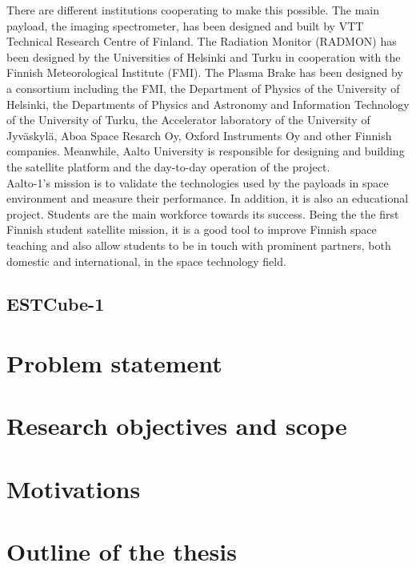 There are different institutions cooperating to make this possible. The main payload, the imaging spectrometer, has been designed and built by VTT Technical Research Centre of Finland. The Radiation Monitor (RADMON) has been designed by the Universities of Helsinki and Turku in cooperation with the Finnish Meteorological Institute (FMI). The Plasma Brake has been designed by a consortium including the FMI, the Department of Physics of the University of Helsinki, the Departments of Physics and Astronomy and Information Technology of the University of Turku, the Accelerator laboratory of the University of Jyväskylä, Aboa Space Resarch Oy, Oxford Instruments Oy and other Finnish companies. Meanwhile, Aalto University is responsible for designing and building the satellite platform and the day-to-day operation of the project.\cite{AALTO1b}\\
\newpage
Aalto-1's mission is to validate the technologies used by the payloads in space environment and measure their performance. In addition, it is also an educational project. Students are the main workforce towards its success. Being the the first Finnish student satellite mission, it is a good tool to improve Finnish space teaching and also allow students to be in touch with prominent partners, both domestic and international, in the space technology field.


\subsection{ESTCube-1}








\section{Problem statement}\label{1.2}


\section{Research objectives and scope}



\section{Motivations}



\section{Outline of the thesis}


\pagebreak
